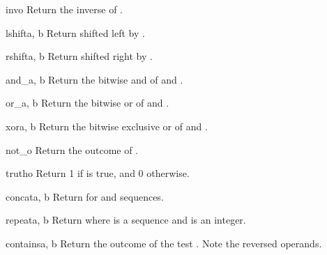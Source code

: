 \begin{funcdesc}{inv}{o}
Return the inverse of .
\end{funcdesc}

\begin{funcdesc}{lshift}{a, b}
Return  shifted left by .
\end{funcdesc}

\begin{funcdesc}{rshift}{a, b}
Return  shifted right by .
\end{funcdesc}

\begin{funcdesc}{and_}{a, b}
Return the bitwise and of  and .
\end{funcdesc}

\begin{funcdesc}{or_}{a, b}
Return the bitwise or of  and .
\end{funcdesc}

\begin{funcdesc}{xor}{a, b}
Return the bitwise exclusive or of  and .
\end{funcdesc}

\begin{funcdesc}{not_}{o}
Return the outcome of  .
\end{funcdesc}

\begin{funcdesc}{truth}{o}
Return 1 if  is true, and 0 otherwise.
\end{funcdesc}

\begin{funcdesc}{concat}{a, b}
Return  \code{+}  for  and  sequences.
\end{funcdesc}

\begin{funcdesc}{repeat}{a, b}
Return  \code{*}  where  is a sequence and
 is an integer.
\end{funcdesc}

\begin{funcdesc}{contains}{a, b}
Return the outcome of the test   .
Note the reversed operands.
\end{funcdesc}

